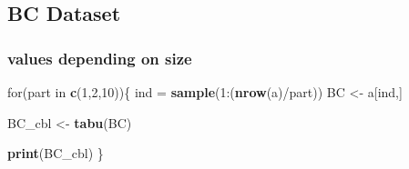 \documentclass[]{article}
\newenvironment{Shaded}{\begin{snugshade}}{\end{snugshade}}
\newcommand{\KeywordTok}[1]{\textcolor[rgb]{0.13,0.29,0.53}{\textbf{{#1}}}}
\newcommand{\DecValTok}[1]{\textcolor[rgb]{0.00,0.00,0.81}{{#1}}}
\newcommand{\StringTok}[1]{\textcolor[rgb]{0.31,0.60,0.02}{{#1}}}
\newcommand{\NormalTok}[1]{{#1}}
\begin{document}
\subsection{BC Dataset}\label{bc-dataset}

\subsubsection{values depending on size}\label{values-depending-on-size}

\begin{Shaded}
\begin{Highlighting}[]
\NormalTok{for(part in }\KeywordTok{c}\NormalTok{(}\DecValTok{1}\NormalTok{,}\DecValTok{2}\NormalTok{,}\DecValTok{10}\NormalTok{))\{}
    \NormalTok{ind =}\StringTok{ }\KeywordTok{sample}\NormalTok{(}\DecValTok{1}\NormalTok{:(}\KeywordTok{nrow}\NormalTok{(a)/part))}
    \NormalTok{BC <-}\StringTok{ }\NormalTok{a[ind,]}
    
    \NormalTok{BC_cbl <-}\StringTok{ }\KeywordTok{tabu}\NormalTok{(BC)}
    
    \KeywordTok{print}\NormalTok{(BC_cbl)}
\NormalTok{\}}
\end{Highlighting}
\end{Shaded}
\end{document}

